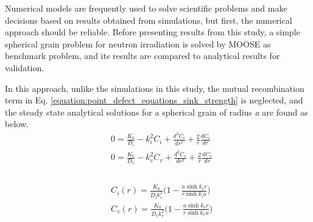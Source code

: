 \documentclass[a4paper]{article}
\begin{document}
  Numerical models are frequently used to solve scientific problems and make decisions based on results obtained from simulations, but first, the numerical approach should be reliable. Before presenting results from this study, a simple spherical grain problem for neutron irradiation is solved by MOOSE as benchmark problem, and its results are compared to analytical results for validation.

  In this approach, unlike the simulations in this study, the mutual recombination term in Eq. \ref{equation:point_defect_equations_sink_strength} is neglected, and the steady state analytical solutions for a spherical grain of radius \textit{a} are found as below.\cite{heald1977}\\

  \begin{equation}
    \begin{aligned}
      &0 = \frac{K_0}{D_i} - k_i^2C_i + \frac{d^2C_i}{dr^2}+\frac{2}{r}\frac{dC_i}{dr}\\
      &0 = \frac{K_0}{D_v} - k_v^2C_v + \frac{d^2C_v}{dr^2}+\frac{2}{r}\frac{dC_v}{dr}\\
    \end{aligned}
    \label{equation:spherical_norecomb_point_defect_equations}
  \end{equation}\\
  \begin{equation}
    \begin{aligned}
      &C_i(r)=\frac{K_0}{D_ik_i^2}\bigg(1-\frac{a\sinh{k_ir}}{r\sinh{k_ia}}\bigg)\\
      &C_v(r)=\frac{K_0}{D_vk_v^2}\bigg(1-\frac{a\sinh{k_vr}}{r\sinh{k_va}}\bigg)\\
    \end{aligned}
    \label{equation:spherical_grain_analytical_solution}
  \end{equation}\\
\end{document}
